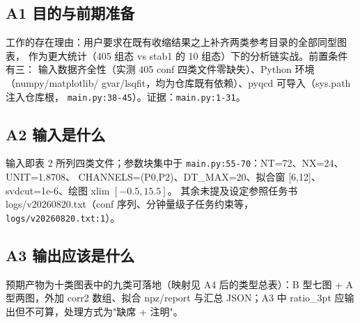 \documentclass[UTF8]{ctexart}
\begin{document}
\subsection{A1 目的与前期准备}
工作的存在理由：用户要求在既有收缩结果之上补齐两类参考目录的全部同型图表，
作为更大统计（405 组态 vs stab1 的 10 组态）下的分析链实战。前置条件有三：
输入数据齐全性（实测 405 conf 四类文件零缺失）、Python 环境（numpy/matplotlib/
gvar/lsqfit，均为仓库既有依赖）、pyqcd 可导入（sys.path 注入仓库根，
\texttt{\nolinkurl{main.py:38-45}}）。证据：\textcolor{evidence}{\texttt{\nolinkurl{main.py:1-31}}}。
\subsection{A2 输入是什么}
输入即表 2 所列四类文件；参数块集中于
\textcolor{evidence}{\texttt{\nolinkurl{main.py:55-70}}}：NT=72、NX=24、UNIT=1.8708、
CHANNELS=(P0,P2)、DT\_MAX=20、拟合窗 [6,12]、svdcut=1e-6、绘图 xlim $[-0.5,15.5]$。
其余未提及设定参照任务书 logs/v20260820.txt（conf 序列、分钟量级子任务约束等，
\textcolor{reference}{\texttt{\nolinkurl{logs/v20260820.txt:1}}}）。
\subsection{A3 输出应该是什么}
预期产物为十类图表中的九类可落地（映射见 A4 后的类型总表）：B 型七图 +
A 型两图，外加 corr2 数组、拟合 npz/report 与汇总 JSON；A3 中 ratio\_3pt
应输出但不可算，处理方式为"缺席 + 注明"。
\end{document}
